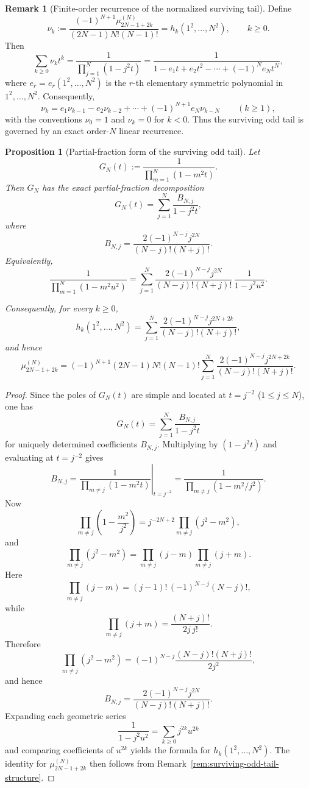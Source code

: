 \documentclass[11pt,a4paper]{amsart}
\theoremstyle{plain}
\newtheorem{proposition}[theorem]{Proposition}
\theoremstyle{definition}
\newtheorem{remark}[theorem]{Remark}
\begin{document}
\begin{remark}[Finite-order recurrence of the normalized surviving tail]
\label{rem:n-point-tail-recurrence}
Define
\[
\nu_k
:=
\frac{(-1)^{N+1}\mu_{2N-1+2k}^{(N)}}{(2N-1)N!(N-1)!}
=
h_k(1^2,\dots,N^2),
\qquad k\ge 0.
\]
Then
\[
\sum_{k\ge 0}\nu_k t^k
=
\frac{1}{\prod_{j=1}^N(1-j^2t)}
=
\frac{1}{1-e_1 t+e_2 t^2-\cdots+(-1)^N e_N t^N},
\]
where $e_r=e_r(1^2,\dots,N^2)$ is the $r$-th elementary symmetric
polynomial in $1^2,\dots,N^2$. Consequently,
\[
\nu_k
=
e_1\nu_{k-1}-e_2\nu_{k-2}+\cdots+(-1)^{N+1}e_N\nu_{k-N}
\qquad (k\ge 1),
\]
with the conventions $\nu_0=1$ and $\nu_{k}=0$ for $k<0$. Thus the
surviving odd tail is governed by an exact order-$N$ linear recurrence.
\end{remark}

\begin{proposition}[Partial-fraction form of the surviving odd tail]
\label{prop:n-point-tail-partial-fractions}
Let
\[
G_N(t):=\frac{1}{\prod_{m=1}^N(1-m^2 t)}.
\]
Then $G_N$ has the exact partial-fraction decomposition
\[
G_N(t)
=
\sum_{j=1}^N \frac{B_{N,j}}{1-j^2 t},
\]
where
\[
B_{N,j}
=
\frac{2(-1)^{N-j}j^{2N}}{(N-j)!(N+j)!}.
\]
Equivalently,
\[
\frac{1}{\prod_{m=1}^N(1-m^2u^2)}
=
\sum_{j=1}^N
\frac{2(-1)^{N-j}j^{2N}}{(N-j)!(N+j)!}\,
\frac{1}{1-j^2u^2}.
\]

Consequently, for every $k\ge 0$,
\[
h_k(1^2,\dots,N^2)
=
\sum_{j=1}^N
\frac{2(-1)^{N-j}j^{2N+2k}}{(N-j)!(N+j)!},
\]
and hence
\[
\mu_{2N-1+2k}^{(N)}
=
(-1)^{N+1}(2N-1)N!(N-1)!
\sum_{j=1}^N
\frac{2(-1)^{N-j}j^{2N+2k}}{(N-j)!(N+j)!}.
\]
\end{proposition}

\begin{proof}
Since the poles of $G_N(t)$ are simple and located at $t=j^{-2}$
($1\le j\le N$), one has
\[
G_N(t)=\sum_{j=1}^N \frac{B_{N,j}}{1-j^2 t}
\]
for uniquely determined coefficients $B_{N,j}$. Multiplying by
$(1-j^2 t)$ and evaluating at $t=j^{-2}$ gives
\[
B_{N,j}
=
\left.
\frac{1}{\prod_{m\ne j}(1-m^2 t)}
\right|_{t=j^{-2}}
=
\frac{1}{\prod_{m\ne j}(1-m^2/j^2)}.
\]
Now
\[
\prod_{m\ne j}\left(1-\frac{m^2}{j^2}\right)
=
j^{-2N+2}\prod_{m\ne j}(j^2-m^2),
\]
and
\[
\prod_{m\ne j}(j^2-m^2)
=
\prod_{m\ne j}(j-m)\prod_{m\ne j}(j+m).
\]
Here
\[
\prod_{m\ne j}(j-m)
=
(j-1)! \,(-1)^{N-j}(N-j)!,
\]
while
\[
\prod_{m\ne j}(j+m)
=
\frac{(N+j)!}{2j\,j!}.
\]
Therefore
\[
\prod_{m\ne j}(j^2-m^2)
=
(-1)^{N-j}\frac{(N-j)!(N+j)!}{2j^2},
\]
and hence
\[
B_{N,j}
=
\frac{2(-1)^{N-j}j^{2N}}{(N-j)!(N+j)!}.
\]
Expanding each geometric series
\[
\frac{1}{1-j^2u^2}=\sum_{k\ge 0} j^{2k}u^{2k}
\]
and comparing coefficients of $u^{2k}$ yields the formula for
$h_k(1^2,\dots,N^2)$. The identity for
$\mu_{2N-1+2k}^{(N)}$ then follows from
Remark~\ref{rem:surviving-odd-tail-structure}.
\end{proof}
\end{document}
